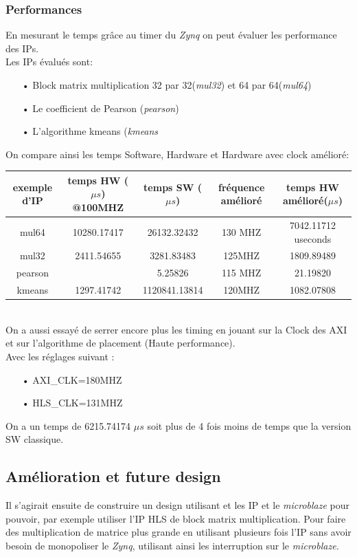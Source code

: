 \documentclass[12pt,a4paper]{ieee}
\begin{document}
\subsubsection{Performances}
En mesurant le temps grâce au timer du \textit{Zynq} on peut évaluer les performance des IPs.\\
Les IPs évalués sont: \begin{itemize}
\item[•]Block matrix multiplication 32 par 32(\textit{mul32}) et 64 par 64(\textit{mul64})
\item[•]Le coefficient de Pearson (\textit{pearson})
\item[•]L'algorithme kmeans (\textit{kmeans}
\end{itemize}
\bigskip
On compare ainsi les temps Software, Hardware et Hardware avec clock amélioré:\\
\bigskip
\begin{tabular}{|c|c|c|c|c|}

\hline
\scriptsize exemple d'IP & \scriptsize temps HW ($\mu s$) @100MHZ &\scriptsize temps SW ($\mu s$) &\scriptsize fréquence amélioré&\scriptsize temps HW amélioré($\mu s$) \\
\hline
mul64 & 10280.17417 & 26132.32432 & 130 MHZ & 7042.11712 useconds\\
mul32&2411.54655  & 3281.83483& 125MHZ & 1809.89489\\
pearson&  &5.25826 &115 MHZ &21.19820\\
kmeans&1297.41742 & 1120841.13814 &120MHZ &1082.07808\\
\hline
\end{tabular}\\
\bigskip
On a aussi essayé de serrer encore plus les timing en jouant sur la Clock des AXI et sur l'algorithme de placement (Haute performance).\\
Avec les réglages suivant : \begin{itemize}
\item[•]AXI\_CLK=180MHZ
\item[•]HLS\_CLK=131MHZ
\end{itemize}
On a un temps de 6215.74174 $\mu s$ soit plus de 4 fois moins de temps que la version SW classique.


\subsection{Amélioration et future design}
Il s'agirait ensuite de construire un design utilisant et les IP et le \textit{microblaze} pour pouvoir, par exemple utiliser l'IP HLS de block matrix multiplication. Pour faire des multiplication de matrice plus grande en utilisant plusieurs fois l'IP sans avoir besoin de monopoliser le \textit{Zynq}, utilisant ainsi les interruption sur le \textit{microblaze.}
\end{document}
